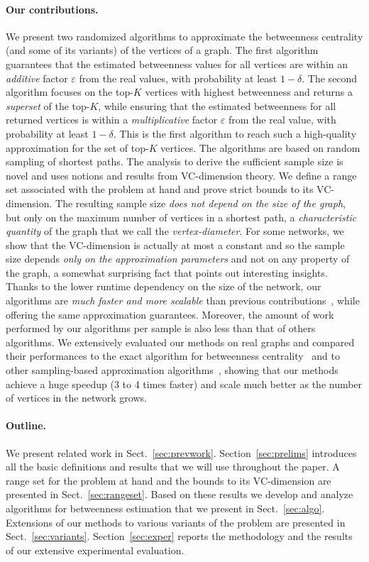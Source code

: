 \paragraph*{Our contributions\ifdmkd.\fi} 
 We present two randomized algorithms to approximate the betweenness centrality
(and some of its variants) of the vertices of a graph. The first algorithm
guarantees that the estimated betweenness values for all vertices are within an
\emph{additive} factor $\varepsilon$ from the real values, with probability at
least $1-\delta$. The second algorithm focuses on the top-$K$ vertices with
highest betweenness and returns a \emph{superset} of the top-$K$,
while ensuring that the estimated betweenness for all returned vertices is
within a \emph{multiplicative} factor $\varepsilon$ from the real value, with
probability at least $1-\delta$. This is the first algorithm to reach such a
high-quality approximation for the set of top-$K$ vertices. The algorithms are
based on random sampling of shortest paths. The analysis to derive the
sufficient sample size is novel and uses notions and results from VC-dimension
theory. We define a range set associated with the problem at hand and prove strict
bounds to its VC-dimension. The resulting sample size \emph{does not
depend on the size of the graph}, but only on the maximum number of vertices
in a shortest path, a \emph{characteristic quantity} of the graph that we call
the \emph{vertex-diameter}. For some networks, we show that the VC-dimension is
actually
at most a constant and so the sample size depends \emph{only on the approximation
parameters} and not on any property of the graph, a somewhat surprising fact
that points out interesting insights. Thanks to the lower runtime dependency on
the size of the network, our algorithms are \emph{much faster and more scalable}
than previous contributions~\citep{JacobKLPT05,BrandesP07,GeisbergerSS08}, while
offering the same approximation guarantees. Moreover, the amount of work
performed by our algorithms per sample is also less than that of others algorithms.
We extensively evaluated our methods on real graphs and compared their
performances to the exact algorithm for betweenness centrality~\citep{Brandes01}
and to other sampling-based approximation
algorithms~\citep{JacobKLPT05,BrandesP07,GeisbergerSS08}, showing that our
methods achieve a huge speedup (3 to 4 times faster) and scale much better as
the number of vertices in the network grows.

\paragraph*{Outline\ifdmkd.~\fi} 
 We present related work in Sect.~\ref{sec:prevwork}. Section~\ref{sec:prelims}
introduces all the basic definitions and results that we will use throughout the
paper. A range set for the problem at hand and the bounds to its VC-dimension
are presented in Sect.~\ref{sec:rangeset}. Based on these results we develop and
analyze algorithms for betweenness estimation that we present in
Sect.~\ref{sec:algo}. %
\ifproof
Extensions of our methods to various variants of the problem are presented in
Sect.~\ref{sec:variants}. %
\fi 
Section~\ref{sec:exper} reports the methodology and
the results of our extensive experimental evaluation.

